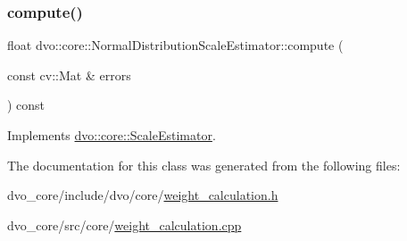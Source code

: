 \subsubsection{\texorpdfstring{compute()}{compute()}}
{\footnotesize\ttfamily float dvo\+::core\+::\+Normal\+Distribution\+Scale\+Estimator\+::compute (\begin{DoxyParamCaption}\item[{const cv\+::\+Mat \&}]{errors }\end{DoxyParamCaption}) const\hspace{0.3cm}{\ttfamily [virtual]}}



Implements \mbox{\hyperlink{classdvo_1_1core_1_1_scale_estimator_a6968ac2cd37c2ce1c966f0c9e17d1a3c}{dvo\+::core\+::\+Scale\+Estimator}}.



The documentation for this class was generated from the following files\+:\begin{DoxyCompactItemize}
\item 
dvo\+\_\+core/include/dvo/core/\mbox{\hyperlink{weight__calculation_8h}{weight\+\_\+calculation.\+h}}\item 
dvo\+\_\+core/src/core/\mbox{\hyperlink{weight__calculation_8cpp}{weight\+\_\+calculation.\+cpp}}\end{DoxyCompactItemize}

